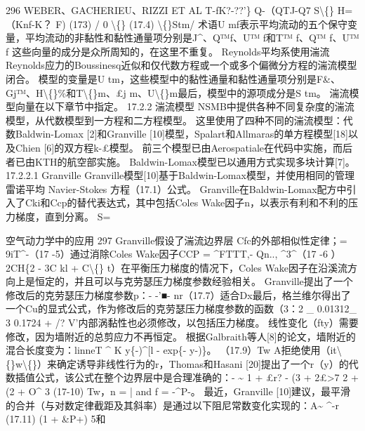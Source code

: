 \documentclass[UTF8,11pt,a4paper,openany,fontset=fandol]{ctexbook}
\begin{document}
296 WEBER、GACHERIEU、RIZZI ET AL T-fK?-??'\} Q-（QTJ-Q7 S\textbackslash\{\} H=（Knf-K？ F) (173) / 0 \textbackslash\{\} (17.4) \textbackslash\{\}Stm/ 术语U mf表示平均流动的五个保守变量，平均流动的非黏性和黏性通量项分别是J\textasciicircum{}、Q™f、U™ f和T™ f、Q™ f、U™ f 这些向量的成分是众所周知的，在这里不重复。 Reynolds平均系使用湍流 Reynolds应力的Boussinesq近似和仅代数方程或一个或多个偏微分方程的湍流模型闭合。 模型的变量是U tm，这些模型中的黏性通量和黏性通量项分别是F\&、Gj™、H\textbackslash\{\}\%和T\textbackslash\{\}m、£j m、U\textbackslash\{\}m最后，模型中的源项成分是S tm。 湍流模型向量在以下章节中指定。 17.2.2 湍流模型 NSMB中提供各种不同复杂度的湍流模型，从代数模型到一方程和二方程模型。 这里使用了四种不同的湍流模型：代数Baldwin-Lomax [2]和Granville [10]模型，Spalart和Allmaras的单方程模型[18]以及Chien [6]的双方程k-£模型。 前三个模型已由Aerospatiale在代码中实施，而后者已由KTH的航空部实施。 Baldwin-Lomax模型已以通用方式实现多块计算[7]。 17.2.2.1 Granville Granville模型[10]基于Baldwin-Lomax模型，并使用相同的管理雷诺平均 Navier-Stokes 方程（17.1）公式。 Granville在Baldwin-Lomax配方中引入了Cki和Ccp的替代表达式，其中包括Coles Wake因子n，以表示有利和不利的压力梯度，直到分离。 S=

空气动力学中的应用 297 Granville假设了湍流边界层 Cfc的外部相似性定律；= 9iT\textasciicircum{}-（17 -5）通过消除Coles Wake因子CCP = \textasciicircum{}FTTT,- Qn.., \textasciicircum{}3\textasciicircum{}（17 -6 ）2CH\{2 - 3C kl + C\textbackslash\{\} t）在平衡压力梯度的情况下，Coles Wake因子在沿溪流方向上是恒定的，并且可以与克劳瑟压力梯度参数经验相关。 Granville提出了一个修改后的克劳瑟压力梯度参数p：- -'■- nr（17.7）适合Dx最后，格兰维尔得出了一个Cu的显式公式，作为修改后的克劳瑟压力梯度参数的函数（3：2 \_ 0.01312\_ 3 0.1724 + /? V'内部涡黏性也必须修改，以包括压力梯度。 线性变化（fty）需要修改，因为墙附近的总剪应力不再恒定。 根据Galbraith等人[8]的论文，墙附近的混合长度变为：linneT \textasciicircum{} K y\{-)\textasciicircum{}[l - exp\{- y-)\}。 （17.9）Tw A拒绝使用（it\textbackslash\{\}w\textbackslash\{\}）来确定诱导非线性行为的r，Thomas和Hasani [20]提出了一个r（y）的代数插值公式，该公式在整个边界层中是合理准确的：- \textasciitilde{} 1 + £r? - (3 + 2£>7 2 + (2 + O\textasciicircum{} 3 (17-10) Tw，n = | and f = -\textasciicircum{}P-。 最近，Granville [10]建议，最平滑的合并（与对数定律截距及其斜率）是通过以下阻尼常数变化实现的：A\textasciitilde{} \textasciicircum{}-r (17.11) (1 + \&P+) 5和
\end{document}
